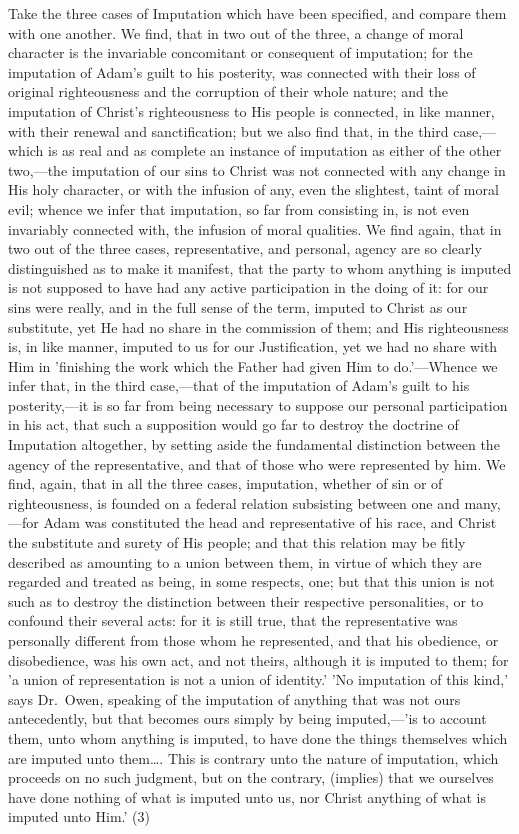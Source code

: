\documentclass[
]{book}
\begin{document}
Take the three cases of Imputation which have been specified, and compare them with one another. We find, that in two out of the three, a change of moral character is the invariable concomitant or consequent of imputation; for the imputation of Adam's guilt to his posterity, was connected with their loss of original righteousness and the corruption of their whole nature; and the imputation of Christ's righteousness to His people is connected, in like manner, with their renewal and sanctification; but we also find that, in the third case,---which is as real and as complete an instance of imputation as either of the other two,---the imputation of our sins to Christ was not connected with any change in His holy character, or with the infusion of any, even the slightest, taint of moral evil; whence we infer that imputation, so far from consisting in, is not even invariably connected with, the infusion of moral qualities. We find again, that in two out of the three cases, representative, and personal, agency are so clearly distinguished as to make it manifest, that the party to whom anything is imputed is not supposed to have had any active participation in the doing of it: for our sins were really, and in the full sense of the term, imputed to Christ as our substitute, yet He had no share in the commission of them; and His righteousness is, in like manner, imputed to us for our Justification, yet we had no share with Him in 'finishing the work which the Father had given Him to do.'---Whence we infer that, in the third case,---that of the imputation of Adam's guilt to his posterity,---it is so far from being necessary to suppose our personal participation in his act, that such a supposition would go far to destroy the doctrine of Imputation altogether, by setting aside the fundamental distinction between the agency of the representative, and that of those who were represented by him. We find, again, that in all the three cases, imputation, whether of sin or of righteousness, is founded on a federal relation subsisting between one and many,---for Adam was constituted the head and representative of his race, and Christ the substitute and surety of His people; and that this relation may be fitly described as amounting to a union between them, in virtue of which they are regarded and treated as being, in some respects, one; but that this union is not such as to destroy the distinction between their respective personalities, or to confound their several acts: for it is still true, that the representative was personally different from those whom he represented, and that his obedience, or disobedience, was his own act, and not theirs, although it is imputed to them; for 'a union of representation is not a union of identity.' 'No imputation of this kind,' says Dr.~Owen, speaking of the imputation of anything that was not ours antecedently, but that becomes ours simply by being imputed,---'is to account them, unto whom anything is imputed, to have done the things themselves which are imputed unto them\ldots. This is contrary unto the nature of imputation, which proceeds on no such judgment, but on the contrary, (implies) that we ourselves have done nothing of what is imputed unto us, nor Christ anything of what is imputed unto Him.' (3)
\end{document}
